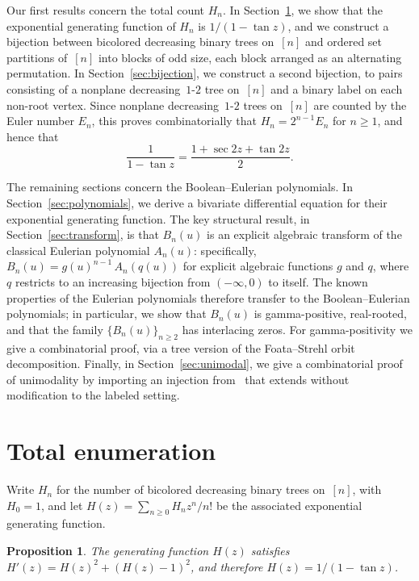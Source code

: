 \documentclass[10pt]{article}
\theoremstyle{plain}
\newtheorem{proposition}[theorem]{Proposition}
\begin{document}
Our first results concern the total count $H_n$. In Section~\ref{sec:total}, we show that the exponential generating function of $H_n$ is $1/(1 - \tan z)$, and we construct a bijection between bicolored decreasing binary trees on~$[n]$ and ordered set partitions of~$[n]$ into blocks of odd size, each block arranged as an alternating permutation. In Section~\ref{sec:bijection}, we construct a second bijection, to pairs consisting of a nonplane decreasing~$1$-$2$ tree on~$[n]$ and a binary label on each non-root vertex. Since nonplane decreasing~$1$-$2$ trees on~$[n]$ are counted by the Euler number $E_n$, this proves combinatorially that $H_n = 2^{n-1} E_n$ for $n \geq 1$, and hence that
\[
	\frac{1}{1 - \tan z} = \frac{1 + \sec 2z + \tan 2z}{2}.
\]

The remaining sections concern the Boolean--Eulerian polynomials. In Section~\ref{sec:polynomials}, we derive a bivariate differential equation for their exponential generating function. The key structural result, in Section~\ref{sec:transform}, is that $B_n(u)$ is an explicit algebraic transform of the classical Eulerian polynomial $A_n(u)$: specifically, $B_n(u) = g(u)^{n-1}\, A_n(q(u))$ for explicit algebraic functions $g$ and $q$, where $q$ restricts to an increasing bijection from $(-\infty, 0)$ to itself. The known properties of the Eulerian polynomials therefore transfer to the Boolean--Eulerian polynomials; in particular, we show that $B_n(u)$ is gamma-positive, real-rooted, and that the family $\{B_n(u)\}_{n \geq 2}$ has interlacing zeros. For gamma-positivity we give a combinatorial proof, via a tree version of the Foata--Strehl orbit decomposition. Finally, in Section~\ref{sec:unimodal}, we give a combinatorial proof of unimodality by importing an injection from~\cite{bona:boolean--naraya:} that extends without modification to the labeled setting.


\section{Total enumeration}
\label{sec:total}

Write $H_n$ for the number of bicolored decreasing binary trees on~$[n]$, with $H_0 = 1$, and let $H(z) = \sum_{n \geq 0} H_n z^n/n!$ be the associated exponential generating function.

\begin{proposition}
\label{prp:diffeq}
The generating function $H(z)$ satisfies $H'(z) = H(z)^2 + (H(z) - 1)^2$, and therefore $H(z) = 1/(1 - \tan z)$.
\end{proposition}
\end{document}
